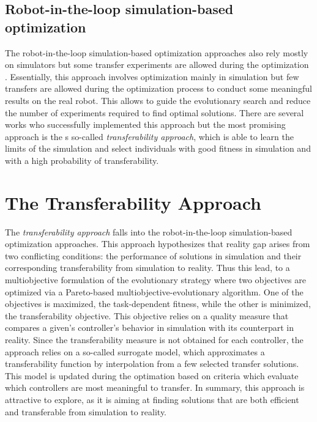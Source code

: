 \subsection{Robot-in-the-loop simulation-based optimization}

The robot-in-the-loop simulation-based optimization approaches also rely mostly on simulators but some transfer experiments are allowed during the optimization \citep{inproceedings}. Essentially, this approach involves optimization mainly in simulation but few transfers are allowed during the optimization process to conduct some meaningful results on the real robot. This allows to guide the evolutionary search and reduce the number of experiments required to find optimal solutions. There are several works who successfully implemented this approach \citep{bongard2006resilient} \citep{koos2009automatic} but the most promising approach is the s so-called \emph{transferability approach}, which is able to learn the limits of the simulation and select individuals with good fitness in simulation and with a high probability of transferability.

\section{The Transferability Approach}

The \emph{transferability approach}\citep{6151107} falls into the robot-in-the-loop simulation-based optimization approaches. This approach hypothesizes that reality gap arises from two conflicting conditions: the performance of solutions in simulation and their corresponding transferability from simulation to reality. Thus this lead, to a multiobjective formulation of the evolutionary strategy where two objectives are optimized via a Pareto-based multiobjective-evolutionary algorithm. One of the objectives is maximized, the task-dependent fitness, while the other is minimized, the transferability objective. This objective relies on a quality measure that compares a given's controller's behavior in simulation with its counterpart in reality.  Since the transferability measure is not obtained for each controller, the approach relies on a so-called surrogate model, which approximates a transferability function by interpolation from a few selected transfer solutions. This model is updated during the optimation based on criteria which evaluate which controllers are most meaningful to transfer. In summary, this approach is attractive to explore, as it is aiming at finding solutions that are both efficient and transferable from simulation to reality.

